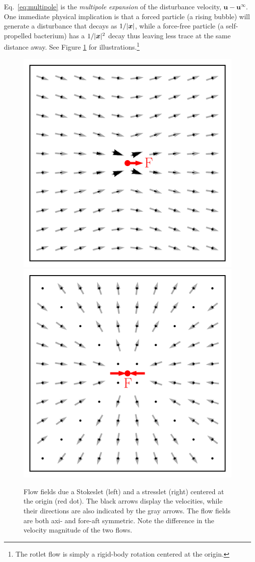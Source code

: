 Eq.\ \eqref{eq:multipole} is the \emph{multipole expansion} of the disturbance velocity, ${\bm u}-{\bm u}^\infty$. One immediate physical implication is that a forced particle (\eg a rising bubble) will generate a disturbance that decays as $1/\lvert\bm x\rvert$, while a force-free particle (\eg a self-propelled bacterium) has a $1/\lvert\bm x\rvert^2$ decay thus leaving less trace at the same distance away. See Figure \ref{fig:lets} for illustrations.\footnote{The rotlet flow is simply a rigid-body rotation centered at the origin.}

\begin{figure}%
  \centering
  \includegraphics[width=0.49\columnwidth]{stokeslet1.pdf}
  \includegraphics[width=0.49\columnwidth]{stresslet1.pdf}
  \caption{Flow fields due a Stokeslet (left) and a stresslet (right) centered at the origin (red dot). The black arrows display the velocities, while their directions are also indicated by the gray arrows. The flow fields are both axi- and fore-aft symmetric. Note the difference in the velocity magnitude of the two flows.}
  \label{fig:lets}
\end{figure}

